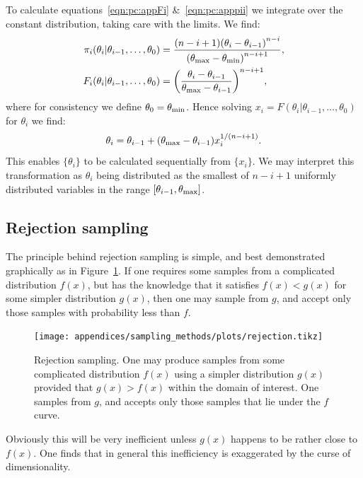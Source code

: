To calculate equations~\eqref{eqn:pc:appFi} \&~\ref{eqn:pc:apppii} we integrate over the constant distribution, taking care with the limits. We find:
\begin{align}
  \pi_i(\theta_i|\theta_{i-1},\ldots,\theta_0) &= \frac{(n-i+1){(\theta_i-\theta_{i-1})}^{n-i}}{{(\theta_{\mathrm{max}}-\theta_{\mathrm{min}})}^{n-i+1}},\\
  F_i(\theta_i|\theta_{i-1},\ldots,\theta_0) &= {\left(\frac{\theta_i-\theta_{i-1}}{\theta_{\mathrm{max}}-\theta_{i-1}}\right)}^{n-i+1},
  \label{eqn:pc:sorted_uniform_calc}
\end{align}
where for consistency we define \(\theta_0 = \theta_{\mathrm{min}}\). Hence solving \(x_i=F(\theta_i|\theta_{i-1},\ldots,\theta_0)\) for \(\theta_i\) we find:
\begin{equation}
  \theta_i = \theta_{i-1}+ (\theta_{\mathrm{max}}-\theta_{i-1})x_i^{1/(n-i+1)}.
  \label{eqn:pc:sorted_uniform_trans}
\end{equation}
This enables \(\{\theta_i\}\) to be calculated sequentially from \(\{x_i\}\). We may interpret this transformation as \(\theta_i\) being distributed as the smallest of \(n-i+1\) uniformly distributed variables in the range \([\theta_{i-1},\theta_{\mathrm{max}}]\).



\subsection{Rejection sampling}
\label{sec:sm:rejection}

The principle behind rejection sampling is simple, and best demonstrated graphically as in Figure~\ref{fig:sm:rej}. If one requires some samples from a complicated distribution \(f(x)\), but has the knowledge that it satisfies \(f(x)<g(x)\) for some simpler distribution \(g(x)\), then one may sample from \(g\), and accept only those samples with probability less than \(f\). 

\begin{figure}[tp]
  \centering
  \texttt{[image: appendices/sampling\_methods/plots/rejection.tikz]}
  \caption{Rejection sampling. One may produce samples from some complicated distribution \(f(x)\) using a simpler distribution \(g(x)\) provided that \(g(x)>f(x)\) within the domain of interest. One samples from \(g\), and accepts only those samples that lie under the \(f\) curve.\label{fig:sm:rej}}
\end{figure}

Obviously this will be very inefficient unless \(g(x)\) happens to be rather close to \(f(x)\). One finds that in general this inefficiency is exaggerated by the curse of dimensionality.

